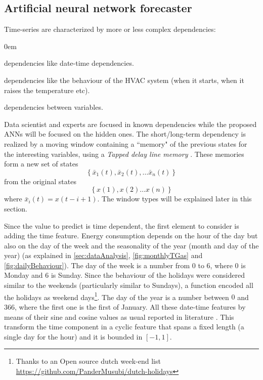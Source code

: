 \documentclass{sig-alternate-sigmod07}
\begin{document}
\subsection{Artificial neural network forecaster}
\label{sec:predictor}

Time-series are characterized by more or less complex dependencies:
\begin{description}
\itemsep0em
  \item[Known] dependencies like date-time dependencies.
  \item[Hidden] dependencies like the behaviour of the HVAC system (when it starts, when it raises the temperature etc).
  \item[Short/long-term] dependencies between variables.
\end{description}
Data scientist and experts are focused in known dependencies while the proposed ANNs will be focused on the hidden ones.
The short/long-term dependency is realized by a moving window containing a ``memory" of the previous states for the interesting variables, using a \emph{Tapped delay line memory} \cite{mozer2007neural}. These memories form a new set of states \begin{displaymath}\left\{\bar{x}_1(t), \bar{x}_2(t), \ldots \bar{x}_n(t)\right\}\end{displaymath} from the original states \begin{displaymath}\left\{x(1), x(2) \ldots x(n)\right\}\end{displaymath}where $\bar{x}_i(t) = x(t - i + 1)$. The window types will be explained later in this section. 

Since the value to predict is time dependent, the first element to consider is adding the time feature. Energy consumption depends on the hour of the day but also on the day of the week and the seasonality of the year (month and day of the year) (as explained in \cref{sec:dataAnalysis}, \cref{fig:monthlyTGas} and \cref{fig:dailyBehaviour}). The day of the week is a number from $0$ to $6$, where $0$ is Monday and 6 is Sunday. Since the behaviour of the holidays were considered similar to the weekends (particularly similar to Sundays), a function encoded all the holidays as weekend days\footnote{Thanks to an Open source dutch week-end list \url{https://github.com/PanderMusubi/dutch-holidays}}. The day of the year is a number between $0$ and $366$, where the first one is the first of January. All these date-time features by means of their sine and cosine values as usual reported in literature \cite{ohlsson1994predicting, dodier2004statistical, gonzalez2005prediction}. This transform the time component in a cyclic feature that spans a fixed length (a single day for the hour) and it is bounded in $[-1,1]$.
\end{document}
